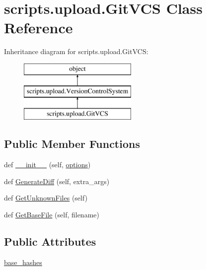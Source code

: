 \hypertarget{classscripts_1_1upload_1_1_git_v_c_s}{}\section{scripts.\+upload.\+Git\+V\+CS Class Reference}
\label{classscripts_1_1upload_1_1_git_v_c_s}
Inheritance diagram for scripts.\+upload.\+Git\+V\+CS\+:\begin{figure}[H]
\begin{center}
\leavevmode
\includegraphics[height=3.000000cm]{d3/d02/classscripts_1_1upload_1_1_git_v_c_s}
\end{center}
\end{figure}
\subsection*{Public Member Functions}
\begin{DoxyCompactItemize}
\item 
def \mbox{\hyperlink{classscripts_1_1upload_1_1_git_v_c_s_a79253ecc9f86353a766adc8c8c959f29}{\+\_\+\+\_\+init\+\_\+\+\_\+}} (self, \mbox{\hyperlink{classscripts_1_1upload_1_1_version_control_system_a090853e1034cd5dfe4fd0118201e5af1}{options}})
\item 
def \mbox{\hyperlink{classscripts_1_1upload_1_1_git_v_c_s_abb1b442ca3cf81472388afa047932b7c}{Generate\+Diff}} (self, extra\+\_\+args)
\item 
def \mbox{\hyperlink{classscripts_1_1upload_1_1_git_v_c_s_afab4ff2428d5e4220f376471aa53e90e}{Get\+Unknown\+Files}} (self)
\item 
def \mbox{\hyperlink{classscripts_1_1upload_1_1_git_v_c_s_ace8b049081fca38f0794d4b17cd5f5cd}{Get\+Base\+File}} (self, filename)
\end{DoxyCompactItemize}
\subsection*{Public Attributes}
\begin{DoxyCompactItemize}
\item 
\mbox{\hyperlink{classscripts_1_1upload_1_1_git_v_c_s_ad3287cfe3e70a11ead043def0c2b8a06}{base\+\_\+hashes}}
\end{DoxyCompactItemize}



